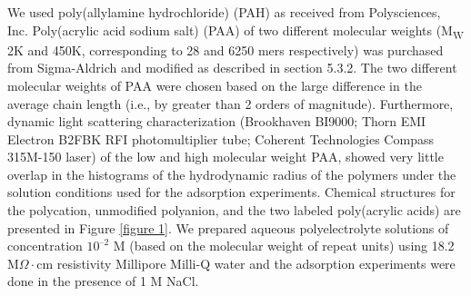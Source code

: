 \documentclass[journal=mamobx,manuscript=article]{achemso}
\begin{document}
We used poly(allylamine hydrochloride) (PAH) as received from Polysciences, Inc. Poly(acrylic acid sodium salt) (PAA) of two different molecular weights (M\textsubscript{W} 2K and 450K, corresponding to 28 and 6250 mers respectively) was purchased from Sigma-Aldrich and modified as described in section 5.3.2.  The two different molecular weights of PAA were chosen based on the large difference in the average chain length (i.e., by greater than 2 orders of magnitude).  Furthermore, dynamic light scattering characterization (Brookhaven BI9000; Thorn EMI Electron B2FBK RFI photomultiplier tube; Coherent Technologies Compass 315M-150 laser) of the low and high molecular weight PAA, showed very little overlap in the histograms of the hydrodynamic radius of the polymers under the solution conditions used for the adsorption experiments.  Chemical structures for the polycation, unmodified polyanion, 
and the two labeled poly(acrylic acids) are presented in Figure \ref{figure 1}.  We prepared aqueous polyelectrolyte solutions of concentration $10^{–2}$ M (based on the molecular weight of repeat units) using 18.2 M$\Omega\cdot$cm resistivity Millipore Milli-Q water and the adsorption experiments were done in the presence of 1 M NaCl.
%
\end{document}
